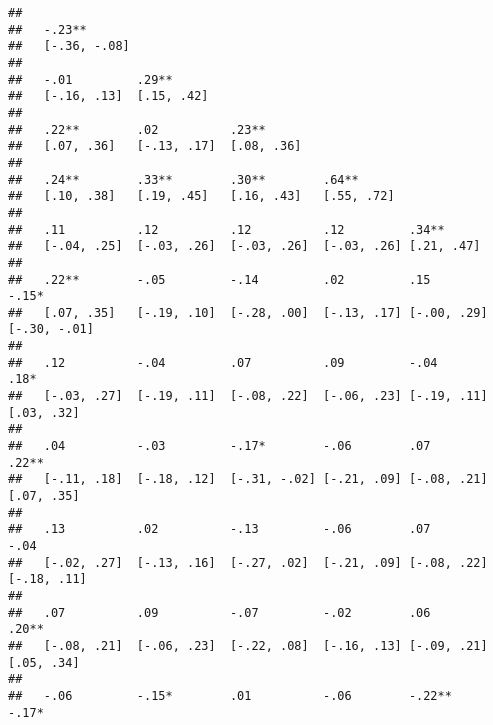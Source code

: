 \documentclass[
]{article}
\begin{document}
\begin{verbatim}
##                                                                               
##   -.23**                                                                      
##   [-.36, -.08]                                                                
##                                                                               
##   -.01         .29**                                                          
##   [-.16, .13]  [.15, .42]                                                     
##                                                                               
##   .22**        .02          .23**                                             
##   [.07, .36]   [-.13, .17]  [.08, .36]                                        
##                                                                               
##   .24**        .33**        .30**        .64**                                
##   [.10, .38]   [.19, .45]   [.16, .43]   [.55, .72]                           
##                                                                               
##   .11          .12          .12          .12         .34**                    
##   [-.04, .25]  [-.03, .26]  [-.03, .26]  [-.03, .26] [.21, .47]               
##                                                                               
##   .22**        -.05         -.14         .02         .15          -.15*       
##   [.07, .35]   [-.19, .10]  [-.28, .00]  [-.13, .17] [-.00, .29]  [-.30, -.01]
##                                                                               
##   .12          -.04         .07          .09         -.04         .18*        
##   [-.03, .27]  [-.19, .11]  [-.08, .22]  [-.06, .23] [-.19, .11]  [.03, .32]  
##                                                                               
##   .04          -.03         -.17*        -.06        .07          .22**       
##   [-.11, .18]  [-.18, .12]  [-.31, -.02] [-.21, .09] [-.08, .21]  [.07, .35]  
##                                                                               
##   .13          .02          -.13         -.06        .07          -.04        
##   [-.02, .27]  [-.13, .16]  [-.27, .02]  [-.21, .09] [-.08, .22]  [-.18, .11] 
##                                                                               
##   .07          .09          -.07         -.02        .06          .20**       
##   [-.08, .21]  [-.06, .23]  [-.22, .08]  [-.16, .13] [-.09, .21]  [.05, .34]  
##                                                                               
##   -.06         -.15*        .01          -.06        -.22**       -.17*       

\end{verbatim}
\end{document}

